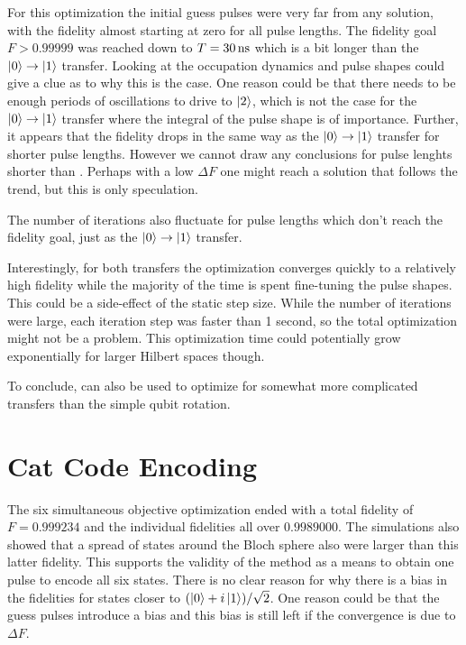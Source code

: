 \documentclass[main.tex]{subfiles}
\begin{document}
For this optimization the initial guess pulses were very far from any solution, with the fidelity almost starting at zero for all pulse lengths.
The fidelity goal \(F > 0.99999\) was reached down to \(T = \SI{30}{\nano\second}\) which is a bit longer than the \(\ket{0}\rightarrow\ket{1}\) transfer.
Looking at the occupation dynamics and pulse shapes could give a clue as to why this is the case.
One reason could be that there needs to be enough periods of oscillations to drive to \(\ket{2}\), which is not the case for the \(\ket{0}\rightarrow\ket{1}\) transfer where the integral of the pulse shape is of importance.
Further, it appears that the fidelity drops in the same way as the \(\ket{0}\rightarrow\ket{1}\) transfer for shorter pulse lengths.
However we cannot draw any conclusions for pulse lenghts shorter than .
Perhaps with a low \(\Delta F\) one might reach a solution that follows the trend, but this is only speculation.

The number of iterations also fluctuate for pulse lengths which don't reach the fidelity goal, just as the \(\ket{0}\rightarrow\ket{1}\) transfer.

Interestingly, for both transfers the optimization converges quickly to a relatively high fidelity while the majority of the time is spent fine-tuning the pulse shapes.
This could be a side-effect of the static step size.
While the number of iterations were large, each iteration step was faster than 1 second, so the total optimization might not be a problem.
This optimization time could potentially grow exponentially for larger Hilbert spaces though.

To conclude, \krotov{} can also be used to optimize for somewhat more complicated transfers than the simple qubit rotation.

\section{Cat Code Encoding}
The six simultaneous objective optimization ended with a total fidelity of \(F = 0.999234\) and the individual fidelities all over \(0.9989000\).
The simulations also showed that a spread of states around the Bloch sphere also were larger than this latter fidelity.
This supports the validity of the method as a means to obtain one pulse to encode all six states.
There is no clear reason for why there is a bias in the fidelities for states closer to \((\ket{0}+i\ket{1})/\sqrt{2}\).
One reason could be that the guess pulses introduce a bias and this bias is still left if the convergence is due to \(\Delta F\).
\end{document}

